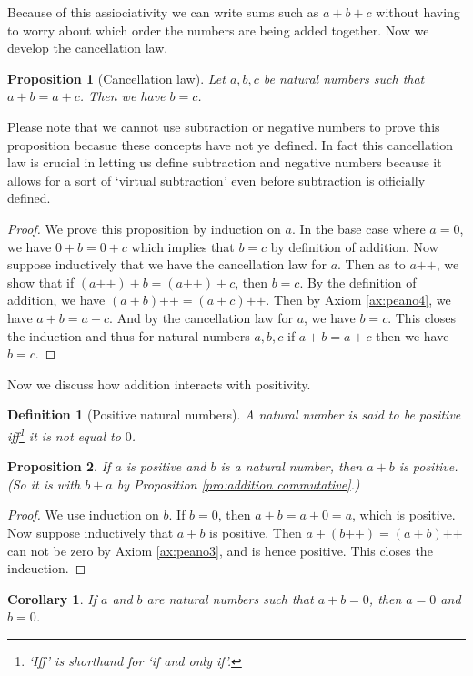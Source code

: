 \documentclass[a4paper]{book}
\newtheorem*{proof}{\textit{Proof.}}
\theoremstyle{break}
\newtheorem{definition}{Definition}[section]
\newtheorem{corollary}{Corollary}[section]
\newtheorem{proposition}{Proposition}[section]
\begin{document}
			Because of this assiociativity we can write sums such as $a+b+c$ without having to worry about which order the numbers are being added together.
			Now we develop the cancellation law.
			\begin{proposition}[Cancellation law]
				Let $a,b,c$ be natural numbers such that $a+b=a+c$. Then we have $b=c$.
			\end{proposition}
			Please note that we cannot use subtraction or negative numbers to prove this proposition becasue these concepts have not ye defined. In fact this cancellation law is crucial in letting us define subtraction and negative numbers because it allows for a sort of `virtual subtraction' even before subtraction is officially defined.
			\begin{proof}
				We prove this proposition by induction on $a$. In the base case where $a=0$, we have $0+b=0+c$ which implies that $b=c$ by definition of addition. Now suppose inductively that we have the cancellation law for $a$. Then as to $a\texttt{++}$, we show that if $(a\texttt{++})+b=(a\texttt{++})+c$, then $b=c$. By the definition of addition, we have $(a+b)\texttt{++}=(a+c)\texttt{++}$. Then by Axiom \ref{ax:peano4}, we have $a+b=a+c$. And by the cancellation law for $a$, we have $b=c$. This closes the induction and thus for natural numbers $a,b,c$ if $a+b=a+c$ then we have $b=c$.
			\end{proof}
			Now we discuss how addition interacts with positivity.
			\begin{definition}[Positive natural numbers]
				A natural number is said to be positive iff\footnote{`Iff' is shorthand for `if and only if'.} it is not equal to $0$.
			\end{definition}
			\begin{proposition}
				\label{pro:a+b>0}
				If $a$ is positive and $b$ is a natural number, then $a+b$ is positive. (So it is with $b+a$ by Proposition \ref{pro:addition commutative}.)
			\end{proposition}
			\begin{proof}
				We use induction on $b$. If $b=0$, then $a+b=a+0=a$, which is positive. Now suppose inductively that $a+b$ is positive. Then $a+(b\texttt{++})=(a+b)\texttt{++}$ can not be zero by Axiom \ref{ax:peano3}, and is hence positive. This closes the indcuction.
			\end{proof}
			\begin{corollary}
				\label{coro:a+b=0}
				If $a$ and $b$ are natural numbers such that $a+b=0$, then $a=0$ and $b=0$.
			\end{corollary}
\end{document}
